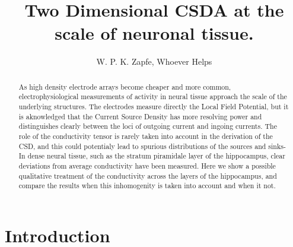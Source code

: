 \documentclass{article}
\title{Two Dimensional CSDA at the scale of neuronal tissue.}
\author{W. P. K. Zapfe, Whoever Helps}
\begin{document}
\maketitle

\begin{abstract}
As high density electrode arrays become cheaper and more common, 
electrophysiological measurements of activity in neural tissue approach
the scale of the underlying structures. The electrodes measure
directly the Local Field Potential, but it is aknowledged that the
Current Source Density has more resolving power and distinguishes
clearly between the loci of outgoing current and ingoing currents.
 The role of the conductivity tensor is rarely taken into account
in the derivation of the CSD, and this could potentialy lead to
spurious distributions of the sources and sinks- 
In dense neural tissue, such as the
stratum piramidale layer of the hippocampus, clear
deviations from average conductivity have been measured. 
Here we show a possible qualitative treatment of the conductivity
across the layers of the hippocampus, and compare the results
when this inhomogenity is taken into account and when it not.
\end{abstract}


\section{Introduction}
\end{document}
